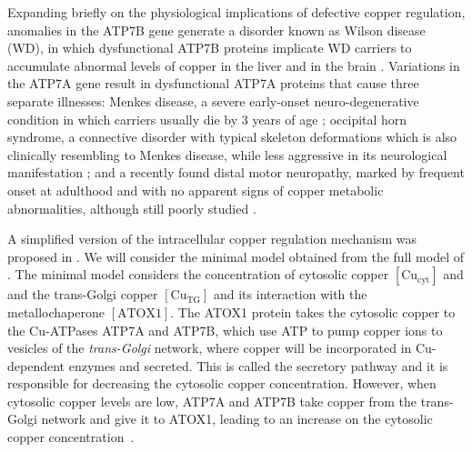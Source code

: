\documentclass[a4paper,fleqn]{cas-dc}
\begin{document}
Expanding briefly on the physiological implications of defective copper regulation, anomalies in the ATP7B gene generate a disorder known as Wilson disease (WD), in which dysfunctional ATP7B proteins implicate WD carriers to accumulate abnormal levels of copper in the liver and in the brain \cite{kaler2008}. 
Variations in the ATP7A gene result in dysfunctional ATP7A proteins that cause three separate illnesses: Menkes disease, a severe early-onset neuro-degenerative condition in which carriers usually die by 3 years of age \cite{kaler1994a}; occipital horn syndrome, a connective disorder with typical skeleton deformations which is also clinically resembling to Menkes disease, while less aggressive in its neurological manifestation \cite{kaler1994b}; and a recently found distal motor neuropathy, marked by frequent onset at adulthood and with no apparent signs of copper metabolic abnormalities, although still poorly studied \cite{kennerson2010, yi2012}.

A simplified version of the intracellular copper regulation mechanism was proposed in \cite{andrade2022}.
We will consider the minimal model obtained from the full model of \cite{andrade2022}.
The minimal model considers the concentration of cytosolic copper $[\text{Cu}_{\text{cyt}}]$ and
and the trans-Golgi copper $[\text{Cu}_{\text{TG}}]$ and its interaction with the metallochaperone $[\text{ATOX1}]$.
The ATOX1 protein takes the cytosolic copper to the Cu-ATPases ATP7A and ATP7B, which use ATP to pump copper ions to vesicles of the \emph{trans-Golgi} network, where copper will be incorporated in Cu-dependent enzymes and secreted. 
This is called the secretory pathway and it is responsible for decreasing the cytosolic copper concentration. 
However, when cytosolic copper levels are low, ATP7A and ATP7B take copper from the trans-Golgi network and give it to ATOX1, leading to an increase on the cytosolic copper concentration~\cite{yu2017}.
\end{document}
